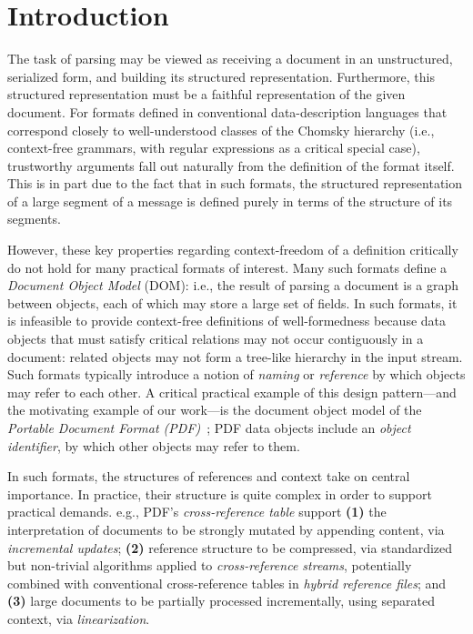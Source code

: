 \section{Introduction}
\label{sec:intro}
The task of parsing may be viewed as receiving a document in an
unstructured, serialized form, and building its structured
representation. Furthermore, this structured representation must be a
faithful representation of the given document.
%
For formats defined in conventional data-description languages that
correspond closely to well-understood classes of the Chomsky hierarchy
(i.e., context-free grammars, with regular expressions as a critical
special case), trustworthy arguments fall out naturally from the
definition of the format itself.
%
This is in part due to the fact that in such formats, the structured
representation of a large segment of a message is defined purely in
terms of the structure of its segments.

However, these key properties regarding context-freedom of a
definition critically do not hold for many practical formats of
interest.
%
Many such formats define a \emph{Document Object Model} (DOM): i.e., the
result of parsing a document is a graph between objects, each
of which may store a large set of fields.
%
In such formats, it is infeasible to provide context-free definitions
of well-formedness because data objects that must satisfy critical
relations may not occur contiguously in a document: related objects
may not form a tree-like hierarchy in the input stream.
%
Such formats typically introduce a notion of \emph{naming} or
\emph{reference} by which objects may refer to each other.
%
A critical practical example of this design pattern---and the
motivating example of our work---is the document object model of the
\emph{Portable Document Format (PDF)}~\cite{isotc171sc2wg8ISO32000220202020};
%
PDF data objects include an \emph{object identifier}, by which other
objects may refer to them.

In such formats, the structures of references and context take on
central importance.
%
In practice, their structure is quite complex in order to support
practical demands.
%
e.g., PDF's \emph{cross-reference table} support
% 
\textbf{(1)} the interpretation of documents to be strongly mutated by
appending content, via \emph{incremental updates};
%
\textbf{(2)} reference structure to be compressed, via standardized
but non-trivial algorithms applied to \emph{cross-reference streams},
potentially combined with conventional cross-reference tables in
\emph{hybrid reference files}; and
% 
\textbf{(3)} large documents to be partially processed incrementally,
using separated context, via \emph{linearization}.

